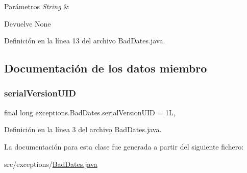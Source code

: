 \begin{DoxyParams}{Parámetros}
{\em String} & \\
\hline
\end{DoxyParams}
\begin{DoxyReturn}{Devuelve}
None 
\end{DoxyReturn}


Definición en la línea 13 del archivo Bad\+Dates.\+java.


\begin{DoxyCode}{0}

\end{DoxyCode}


\subsection{Documentación de los datos miembro}
\mbox{\label{classexceptions_1_1_bad_dates_a1703e41273cdde53ece45e307839c449}} 
\subsubsection{\texorpdfstring{serialVersionUID}{serialVersionUID}}
{\footnotesize\ttfamily final long exceptions.\+Bad\+Dates.\+serial\+Version\+U\+ID = 1L\hspace{0.3cm}{\ttfamily [static]}, {\ttfamily [private]}}



Definición en la línea 3 del archivo Bad\+Dates.\+java.



La documentación para esta clase fue generada a partir del siguiente fichero\+:\begin{DoxyCompactItemize}
\item 
src/exceptions/\mbox{\hyperlink{_bad_dates_8java}{Bad\+Dates.\+java}}\end{DoxyCompactItemize}
